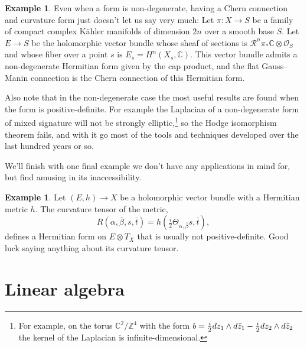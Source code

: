 \documentclass[10pt,a4paper]{amsart}
\theoremstyle{definition}
\newtheorem{exam}[theo]{Example}
\newcommand{\kk}[1]{\mathbb{#1}}
\def\ov#1{\overline{#1}}
\begin{document}
\begin{exam}
Even when a form is non-degenerate, having a Chern connection and curvature form just doesn't let us say very much:
Let $\pi : X \to S$ be a family of compact complex K\"ahler manifolds of dimension $2n$ over a smooth base $S$.
Let $E \to S$ be the holomorphic vector bundle whose sheaf of sections is $\mathcal R^{n}\pi_{*}\mathbb C \otimes \mathcal O_{S}$ and whose fiber over a point $s$ is $E_{s} = H^{n}(X_{s}, \mathbb C)$.
This vector bundle admits a non-degenerate Hermitian form given by the cap product, and the flat Gauss--Manin connection is the Chern connection of this Hermitian form.
\end{exam}

Also note that in the non-degenerate case the most useful results are found when the form is positive-definite. For example the Laplacian of a non-degenerate form of mixed signature will not be strongly elliptic,\footnote{For example, on the torus $\kk C^2 / \kk Z^4$ with the form $b = \smash{\frac i2} dz_1 \wedge d \bar z_1 - \smash{\frac i2} dz_2 \wedge d\bar z_2$ the kernel of the Laplacian is infinite-dimensional.} so the Hodge isomorphism theorem fails, and with it go most of the tools and techniques developed over the last hundred years or so.

We'll finish with one final example we don't have any applications in mind for, but find amusing in its inaccessibility.

\begin{exam}
Let $(E,h) \to X$ be a holomorphic vector bundle with a Hermitian metric $h$. The curvature tensor of the metric,
\[
  R(\alpha, \ov\beta, s, \ov t)
  = h(\tfrac i2 \Theta_{\alpha, \ov\beta}s, \ov t),
\]
defines a Hermitian form on $E \otimes T_{X}$ that is usually not positive-definite. Good luck saying anything about its curvature tensor.
\end{exam}



\section{Linear algebra}
\label{sec:degenerate-linear-algebra}
\end{document}

